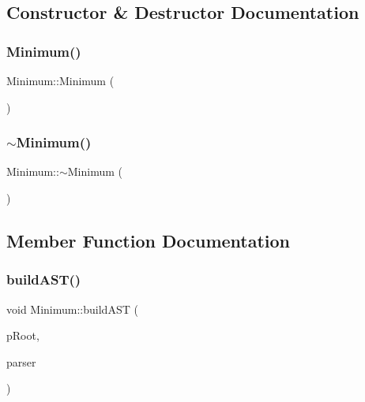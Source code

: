 \subsection{Constructor \& Destructor Documentation}
\mbox{\label{class_minimum_a757e1f05a875048a9baff1b422c8e71a}} 
\subsubsection{\texorpdfstring{Minimum()}{Minimum()}}
{\footnotesize\ttfamily Minimum\+::\+Minimum (\begin{DoxyParamCaption}{ }\end{DoxyParamCaption})}

\mbox{\label{class_minimum_a6b69a901d23bcb75a82b78de6a4bc3af}} 
\subsubsection{\texorpdfstring{$\sim$Minimum()}{~Minimum()}}
{\footnotesize\ttfamily Minimum\+::$\sim$\+Minimum (\begin{DoxyParamCaption}{ }\end{DoxyParamCaption})}



\subsection{Member Function Documentation}
\mbox{\label{class_minimum_abec83657924b745c348bee1ef300e580}} 
\subsubsection{\texorpdfstring{buildAST()}{buildAST()}}
{\footnotesize\ttfamily void Minimum\+::build\+A\+ST (\begin{DoxyParamCaption}\item[{std\+::unique\+\_\+ptr$<$ \mbox{\hyperlink{class_abstract_expression}{Abstract\+Expression}} $>$ \&}]{p\+Root,  }\item[{\mbox{\hyperlink{class_parser}{Parser}} \&}]{parser }\end{DoxyParamCaption})\hspace{0.3cm}{\ttfamily [virtual]}}



